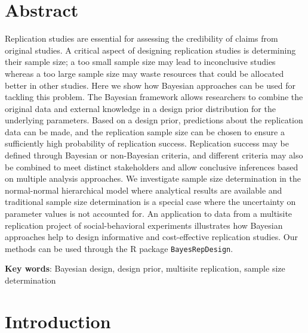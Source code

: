 
\section*{Abstract}

Replication studies are essential for assessing the credibility of claims from
original studies. A critical aspect of designing replication studies is
determining their sample size; a too small sample size may lead to inconclusive
studies whereas a too large sample size may waste resources that could be
allocated better in other studies. Here we show how Bayesian approaches can be
used for tackling this problem. The Bayesian framework allows researchers to
combine the original data and external knowledge in a design prior distribution
for the underlying parameters. Based on a design prior, predictions about the
replication data can be made, and the replication sample size can be chosen to
ensure a sufficiently high probability of replication success. Replication
success may be defined through Bayesian or non-Bayesian criteria, and different
criteria may also be combined to meet distinct stakeholders and allow conclusive
inferences based on multiple analysis approaches. We investigate sample size
determination in the normal-normal hierarchical model where analytical results
are available and traditional sample size determination is a special case where
the uncertainty on parameter values is not accounted for. An application to data
from a multisite replication project of social-behavioral experiments
illustrates how Bayesian approaches help to design informative and
cost-effective replication studies. Our methods can be used through the R
package \texttt{BayesRepDesign}.

\textbf{Key words}: Bayesian design, design prior, multisite replication, sample
size determination



\section{Introduction}

